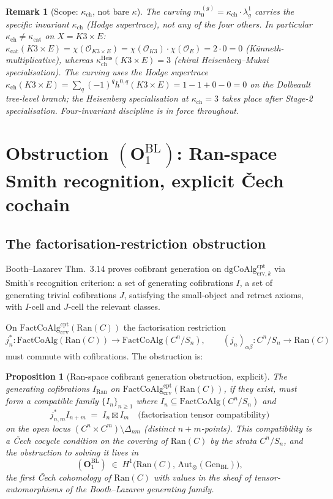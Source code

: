\documentclass[11pt]{amsart}
\newtheorem{proposition}[theorem]{Proposition}
\newtheorem{remark}[theorem]{Remark}
\newcommand{\kch}{\kappa_{\mathrm{ch}}}
\newcommand{\kcat}{\kappa_{\mathrm{cat}}}
\newcommand{\cO}{\mathcal{O}}
\newcommand{\Ran}{\mathrm{Ran}}
\newcommand{\FactCoAlg}{\mathrm{FactCoAlg}}
\newcommand{\crv}{\mathrm{crv}}
\newcommand{\cpt}{\mathrm{cpt}}
\newcommand{\dgCoAlg}{\mathrm{dgCoAlg}}
\begin{document}
\begin{remark}[Scope: $\kch$, not bare $\kappa$]
The curving $m_0^{(g)} = \kch \cdot \lambda_g^1$ carries the
specific invariant $\kch$ (Hodge supertrace), not any of the four
others. In particular $\kch \neq \kcat$ on $X = K3 \times E$:
$\kcat(K3 \times E) = \chi(\cO_{K3 \times E}) = \chi(\cO_{K3}) \cdot
\chi(\cO_E) = 2 \cdot 0 = 0$ (Künneth-multiplicative), whereas
$\kch^{\mathrm{Heis}}(K3 \times E) = 3$ (chiral Heisenberg--Mukai
specialisation). The curving uses the Hodge supertrace
$\kch(K3\times E) = \sum_q (-1)^q h^{0,q}(K3\times E) = 1 - 1 + 0 - 0 = 0$
on the Dolbeault tree-level branch; the Heisenberg specialisation
at $\kch = 3$ takes place after Stage-2 specialisation. Four-invariant
discipline is in force throughout.
\end{remark}

\section{Obstruction $(\mathbf{O}_1^{\mathrm{BL}})$: Ran-space Smith
recognition, explicit \v{C}ech cochain}
\label{sec:O1-ran-smith}

\subsection{The factorisation-restriction obstruction}

Booth--Lazarev Thm.~$3.14$ proves cofibrant generation on
$\dgCoAlg^{\cpt}_{\crv,k}$ via Smith's recognition criterion: a
set of generating cofibrations $I$, a set of generating trivial
cofibrations $J$, satisfying the small-object and retract axioms, with
$I$-cell and $J$-cell the relevant classes.

On $\FactCoAlg^{\cpt}_{\crv}(\Ran(C))$ the factorisation restriction
\[
j^*_n : \FactCoAlg(\Ran(C)) \to \FactCoAlg(C^n/S_n), \qquad
(j_n)_{\alpha\beta} : C^n/S_n \to \Ran(C)
\]
must commute with cofibrations. The obstruction is:

\begin{proposition}[Ran-space cofibrant generation obstruction,
explicit]
\label{prop:O1-explicit}
The generating cofibrations $I_{\Ran}$ on
$\FactCoAlg^{\cpt}_{\crv}(\Ran(C))$, if they exist, must form a
compatible family $\{I_n\}_{n\geq 1}$ where $I_n \subseteq
\FactCoAlg(C^n/S_n)$ and
\[
j^*_{n,m} I_{n+m} \;=\; I_n \boxtimes I_m \quad
\text{(factorisation tensor compatibility)}
\]
on the open locus $(C^n \times C^m) \setminus \Delta_{nm}$ (distinct
$n+m$-points). This compatibility is a \v{C}ech cocycle condition on
the covering of $\Ran(C)$ by the strata $C^n/S_n$, and the obstruction
to solving it lives in
\[
(\mathbf{O}_1^{\mathrm{BL}}) \;\in\; H^1\bigl(\Ran(C),\,
\mathrm{Aut}_\otimes(\mathrm{Gen}_{\mathrm{BL}})\bigr),
\]
the first \v{C}ech cohomology of $\Ran(C)$ with values in the sheaf
of tensor-automorphisms of the Booth--Lazarev generating family.
\end{proposition}
\end{document}
